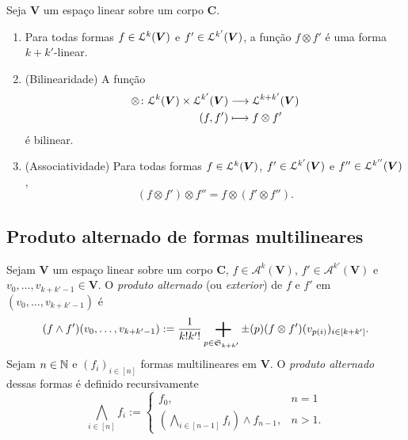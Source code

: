 \begin{proposition}
Seja $\bm V$ um espaço linear sobre um corpo $\bm C$.
	\begin{enumerate}
	\item Para todas formas $f \in \mathcal{L}^k(\bm V)$ e $f' \in \mathcal{L}^{k'}(\bm V)$, a função $f \otimes f'$ é uma forma $k+k'$-linear.
	\item (Bilinearidade) A função
		\begin{align*}
		{\otimes}\colon {\mathcal{L}^k(\bm V) \times \mathcal{L}^{k'}(\bm V)} &\longrightarrow {\mathcal{L}^{k+k'}(\bm V)} \\{(f,f')} &\longmapsto f \otimes f'
		\end{align*}
é bilinear.
	\item (Associatividade) Para todas formas $f \in \mathcal{L}^k(\bm V)$, $f' \in \mathcal{L}^{k'}(\bm V)$ e $f'' \in \mathcal{L}^{k''}(\bm V)$,
		\begin{equation*}
		(f \otimes f') \otimes f'' = f \otimes (f' \otimes f'').
		\end{equation*}
	\end{enumerate}
\end{proposition}

\subsection{Produto alternado de formas multilineares}

\begin{definition}
Sejam $\bm V$ um espaço linear sobre um corpo $\bm C$, $f \in \mathcal{A}^k(\bm V)$, $f' \in \mathcal{A}^{k'}(\bm V)$ e $v_0,\ldots,v_{k+k'-1} \in \bm V$. O \emph{produto alternado} (ou \emph{exterior}) de $f$ e $f'$ em $(v_0,\ldots,v_{k+k'-1})$ é
	\begin{equation*}
	(f \wedge f')(v_0,\ldots,v_{k+k'-1}) := \frac{1}{k!k'!} \sum_{p \in \sime_{k+k'}} \prd(p) (f \otimes f')(v_{p(i)})_{i \in [k+k']}.
	\end{equation*}
Sejam $n \in \mathbb{N}$ e $(f_i)_{i \in [n]}$ formas multilineares em $\bm V$. O \emph{produto alternado} dessas formas é definido recursivamente
	\begin{equation*}
	\bigwedge_{i \in [n]} f_i := \begin{cases}
		f_0,& n=1 \\
		\left(\displaystyle\bigwedge_{i \in [n-1]} f_i \right) \wedge f_{n-1} ,& n>1.
	\end{cases}
	\end{equation*}
\end{definition}


